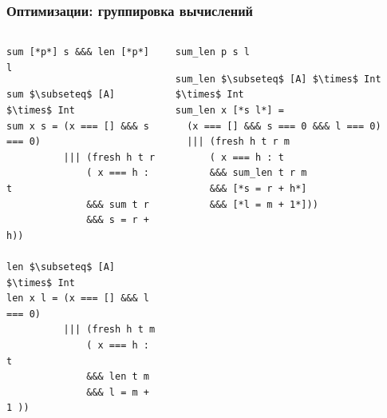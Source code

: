 \documentclass{beamer}
\begin{document}
\begin{frame}[fragile]
  \transwipe[direction=90]
  \frametitle{Оптимизации: группировка вычислений}
\vspace{-15pt}

\begin{columns}[t]
\begin{column}{5.8cm}
\begin{badcode}  
\begin{lstlisting}[frame=single]      
sum [*p*] s &&& len [*p*] l
\end{lstlisting}

\begin{lstlisting}[frame=single]  
sum $\subseteq$ [A] $\times$ Int
sum x s = (x === [] &&& s === 0)
          ||| (fresh h t r
              ( x === h : t 
              &&& sum t r
              &&& s = r + h))
 
len $\subseteq$ [A] $\times$ Int
len x l = (x === [] &&& l === 0)
          ||| (fresh h t m 
              ( x === h : t 
              &&& len t m
              &&& l = m + 1 ))
\end{lstlisting}
\end{badcode}
\end{column}

\pause

\begin{column}{5.55cm}
\begin{goodcode}
\begin{lstlisting}[frame=single]      
sum_len p s l
\end{lstlisting}

\begin{lstlisting}[frame=single]  
sum_len $\subseteq$ [A] $\times$ Int $\times$ Int
sum_len x [*s l*] = 
  (x === [] &&& s === 0 &&& l === 0)
  ||| (fresh h t r m
      ( x === h : t 
      &&& sum_len t r m
      &&& [*s = r + h*]
      &&& [*l = m + 1*]))
\end{lstlisting}
\end{goodcode}
\end{column}
\end{columns}
\end{frame}
\end{document}
